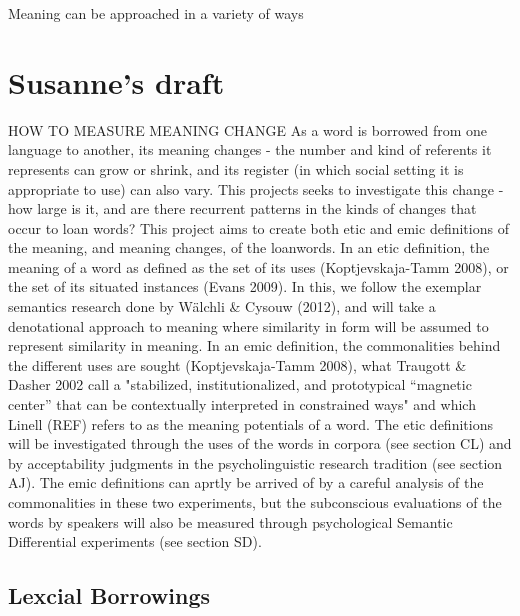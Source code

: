 \documentclass[a4paper]{article}
\begin{document}
Meaning can be approached in a variety of ways \citep{Koptjevskaja-Tamm2008}


\section{Susanne's draft}
HOW TO MEASURE MEANING CHANGE
As a word is borrowed from one language to another, its meaning changes - the number and kind of referents it represents can grow or shrink, and its register (in which social setting it is appropriate to use) can also vary. This projects seeks to investigate this change - how large is it, and are there recurrent patterns in the kinds of changes that occur to loan words? 
This project aims to create both etic and emic definitions of the meaning, and meaning changes, of the loanwords. In an etic definition, the meaning of a word as defined as the set of its uses (Koptjevskaja-Tamm 2008), or the set of its situated instances (Evans 2009). In this, we follow the exemplar semantics research done by Wälchli \& Cysouw (2012), and will take a denotational approach to meaning where similarity in form will be assumed to represent similarity in meaning. In an emic definition, the commonalities behind the different uses are sought (Koptjevskaja-Tamm 2008), what Traugott \& Dasher 2002 call a "stabilized, institutionalized, and prototypical “magnetic center” that can be contextually interpreted in constrained ways" and which Linell (REF) refers to as the meaning potentials of a word.
The etic definitions will be investigated through the uses of the words in corpora (see section CL) and by acceptability judgments in the psycholinguistic research tradition (see section AJ). The emic definitions can aprtly be arrived of by a careful analysis of the commonalities in these two experiments, but the subconscious evaluations of the words by speakers will also be measured through psychological Semantic Differential experiments (see section SD).


\subsection{Lexcial Borrowings}
\end{document}

